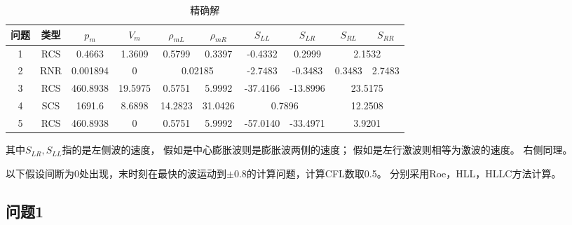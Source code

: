\documentclass[UTF8,zihao=5]{ctexart} %
\begin{document}
\begin{table}[H]
    \small
    \begin{center}
        \caption{精确解}
        \begin{tabular}{|c|c|c|c|c|c|c|c|c|c|}
            \hline
            问题 & 类型 & $p_m$    & $V_m$   & $\rho_{mL}$                   & ${\rho_{mR}}$ & $S_{LL}$                     & $S_{LR}$                      & $S_{RL}$                      & $S_{RR}$ \\
            \hline
            1    & RCS  & 0.4663   & 1.3609  & 0.5799                        & 0.3397        & -0.4332                      & 0.2999                        & \multicolumn{2}{|c|}{2.1532}             \\
            \hline
            2    & RNR  & 0.001894 & 0       & \multicolumn{2}{|c|}{0.02185} & -2.7483       & -0.3483                      & 0.3483                        & 2.7483                                   \\
            \hline
            3    & RCS  & 460.8938 & 19.5975 & 0.5751                        & 5.9992        & -37.4166                     & -13.8996                      & \multicolumn{2}{|c|}{23.5175}            \\
            \hline
            4    & SCS  & 1691.6   & 8.6898  & 14.2823                       & 31.0426       & \multicolumn{2}{|c|}{0.7896} & \multicolumn{2}{|c|}{12.2508}                                            \\
            \hline
            5    & RCS  & 460.8938 & 0       & 0.5751                        & 5.9992        & -57.0140                     & -33.4971                      & \multicolumn{2}{|c|}{3.9201}             \\
            \hline
        \end{tabular}
    \end{center}
\end{table}

其中$S_{LR},S_{LL}$指的是左侧波的速度，
假如是中心膨胀波则是膨胀波两侧的速度；
假如是左行激波则相等为激波的速度。
右侧同理。

以下假设间断为0处出现，末时刻在最快的波运动到$\pm0.8$的计算问题，计算CFL数取0.5。
分别采用Roe，HLL，HLLC方法\cite{2013Riemann}计算。


\subsection{问题1}
\end{document}
